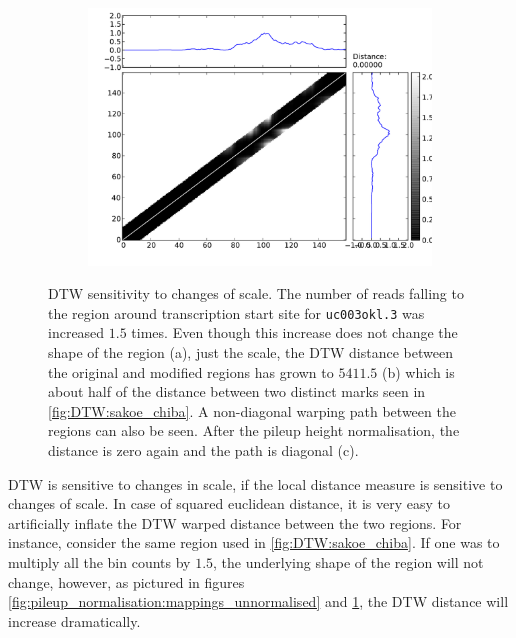 \documentclass[parskip]{cs4rep}
\newcommand{\gene}[1]{{\tt #1}}
\begin{document}
\begin{figure}
\begin{subfigure}[b]{0.3\textwidth}
       \caption{}
       \label{fig:pileup_normalisation:cost_unnormalised}
   \end{subfigure}
   ~
   \begin{subfigure}[b]{0.3\textwidth}
       \includegraphics[width=\textwidth]{figures/methods/pileup_normalisation/cost_x_1_5_x_normalised.pdf}
       \caption{}
       \label{fig:pileup_normalisation:cost_normalised}
   \end{subfigure}
   \caption{DTW sensitivity to changes of scale. The number of reads falling to the region around transcription start site for \gene{uc003okl.3} was increased $1.5$ times. Even though this increase does not change the shape of the region (a), just the scale, the DTW distance between the original and modified regions has grown to $5411.5$ (b) which is about half of the distance between two distinct marks seen in \autoref{fig:DTW:sakoe_chiba}. A non-diagonal warping path between the regions can also be seen. After the pileup height normalisation, the distance is zero again and the path is diagonal (c).}
   \label{fig:pileup_normalisation}
\end{figure}

DTW is sensitive to changes in scale, if the local distance measure is sensitive to changes of scale.
In case of squared euclidean distance, it is very easy to artificially inflate the DTW warped distance between the two regions. For instance, consider the same region used in \autoref{fig:DTW:sakoe_chiba}. If one was to multiply all the bin counts by $1.5$, the underlying shape of the region will not change, however, as pictured in figures \ref{fig:pileup_normalisation:mappings_unnormalised} and \ref{fig:pileup_normalisation:cost_unnormalised}, the DTW distance will increase dramatically.
\end{document}
